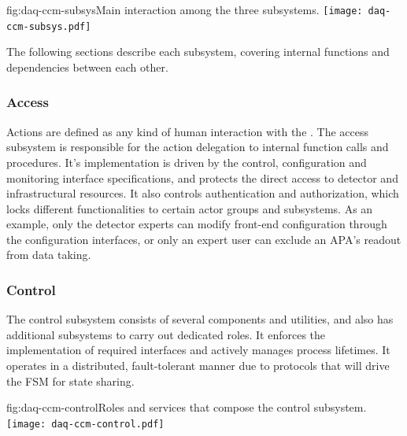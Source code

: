 \begin{dunefigure}{fig:daq-ccm-subsys}{Main interaction among the three  subsystems.}
  \texttt{[image: daq-ccm-subsys.pdf]}
\end{dunefigure}

The following sections describe each  subsystem, covering internal functions and dependencies between each other.

\subsubsection{Access}
\label{sec:daq:design:ccm:access}
Actions are defined as any kind of human interaction with the . The access subsystem is responsible for the action delegation to internal function calls and procedures. It's implementation is driven by the control, configuration and monitoring interface specifications, and protects the direct access to detector and infrastructural resources. It also controls authentication and authorization, which locks different functionalities to certain actor groups and subsystems. As an example, only the detector experts can modify front-end configuration through the configuration interfaces, or only an expert user can exclude an APA's readout from data taking. 


\subsubsection{Control}
\label{sec:daq:design:ccm:control}

The control subsystem consists of several components and utilities, and also has additional subsystems to carry out dedicated roles. It enforces the implementation of required interfaces and actively manages  process lifetimes. It operates in a distributed, fault-tolerant manner due to protocols that will drive the FSM for state sharing. 

\begin{dunefigure}{fig:daq-ccm-control}{Roles and services that compose the  control subsystem.}
  \texttt{[image: daq-ccm-control.pdf]}
\end{dunefigure}

